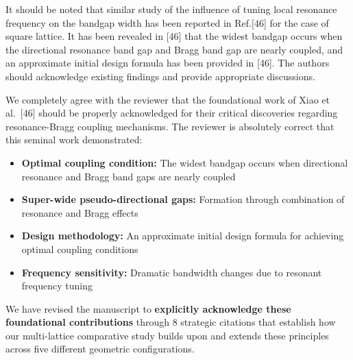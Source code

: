 \documentclass[11pt,a4paper]{article}
\newenvironment{reviewerbox}{%
    \par\medskip\noindent{\color{reviewercolor}\rule{\linewidth}{2pt}}\par
    \noindent{\color{reviewercolor}\bfseries Reviewer Comment}\par\smallskip
}{%
    \par\noindent{\color{reviewercolor}\rule{\linewidth}{0.5pt}}\medskip
}
\newenvironment{responsebox}{%
    \par\medskip\noindent{\color{responsecolor}\rule{\linewidth}{2pt}}\par
    \noindent{\color{responsecolor}\bfseries Response}\par\smallskip
}{%
    \par\noindent{\color{responsecolor}\rule{\linewidth}{0.5pt}}\medskip
}
\begin{document}
\begin{reviewerbox}
It should be noted that similar study of the influence of tuning local resonance frequency on the bandgap width has been reported in Ref.[46] for the case of square lattice. It has been revealed in [46] that the widest bandgap occurs when the directional resonance band gap and Bragg band gap are nearly coupled, and an approximate initial design formula has been provided in [46]. The authors should acknowledge existing findings and provide appropriate discussions.
\end{reviewerbox}

\begin{responsebox}
We completely agree with the reviewer that the foundational work of Xiao et al.~[46] should be properly acknowledged for their critical discoveries regarding resonance-Bragg coupling mechanisms. The reviewer is absolutely correct that this seminal work demonstrated:

\begin{itemize}
    \item \textbf{Optimal coupling condition:} The widest bandgap occurs when directional resonance and Bragg band gaps are nearly coupled
    \item \textbf{Super-wide pseudo-directional gaps:} Formation through combination of resonance and Bragg effects
    \item \textbf{Design methodology:} An approximate initial design formula for achieving optimal coupling conditions
    \item \textbf{Frequency sensitivity:} Dramatic bandwidth changes due to resonant frequency tuning
\end{itemize}

We have revised the manuscript to \textbf{explicitly acknowledge these foundational contributions} through 8 strategic citations that establish how our multi-lattice comparative study builds upon and extends these principles across five different geometric configurations.
\end{responsebox}
\end{document}
